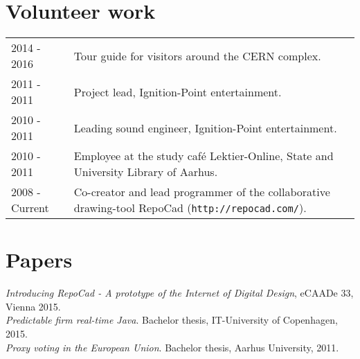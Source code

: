 \documentclass[12pt,a4paper,notitlepage]{article}
\begin{document}
\section*{Volunteer work}
\begin{tabularx}{\textwidth}{l X}
2014 - 2016 & Tour guide for visitors around the CERN complex. \\
2011 - 2011 & Project lead, Ignition-Point entertainment. \\
2010 - 2011 & Leading sound engineer, Ignition-Point entertainment. \\
2010 - 2011 & Employee at the study café Lektier-Online, State and University  Library of Aarhus.  \\
2008 - Current & Co-creator and lead programmer of the collaborative drawing-tool RepoCad (\texttt{http://repocad.com/}).
\end{tabularx}

\section*{Papers}
\textit{Introducing RepoCad  - A prototype of the Internet of Digital Design}, eCAADe 33, Vienna 2015. \\
\textit{Predictable firm real-time Java}. Bachelor thesis, IT-University of Copenhagen, 2015. \\
\textit{Proxy voting in the European Union}. Bachelor thesis, Aarhus University, 2011.
\end{document}

